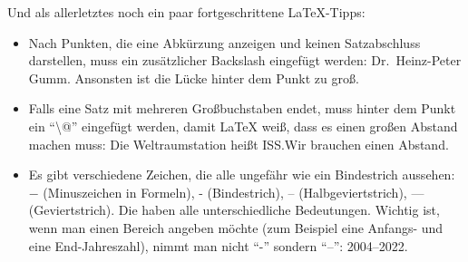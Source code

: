 \documentclass{dsadokumentation}
\begin{document}
Und als allerletztes noch ein paar fortgeschrittene \LaTeX{}-Tipps:
\begin{itemize}
	\item Nach Punkten, die eine Abkürzung anzeigen und keinen Satzabschluss darstellen, muss ein zusätzlicher Backslash eingefügt werden: Dr.\ Heinz-Peter Gumm. Ansonsten ist die Lücke hinter dem Punkt zu groß.
	\item Falls eine Satz mit mehreren Großbuchstaben endet, muss hinter dem Punkt ein \enquote{\textbackslash @} eingefügt werden, damit \LaTeX{} weiß, dass es einen großen Abstand machen muss: Die Weltraumstation heißt ISS.\@ Wir brauchen einen Abstand.
	\item Es gibt verschiedene Zeichen, die alle ungefähr wie ein Bindestrich aussehen: $-$ (Minuszeichen in Formeln), - (Bindestrich), -- (Halbgeviertstrich), --- (Geviertstrich). Die haben alle unterschiedliche Bedeutungen. Wichtig ist, wenn man einen Bereich angeben möchte (zum Beispiel eine Anfangs- und eine End-Jahreszahl), nimmt man nicht \enquote{-} sondern \enquote{--}: 2004--2022.
\end{itemize}


\printbibliography{}
\end{document}

